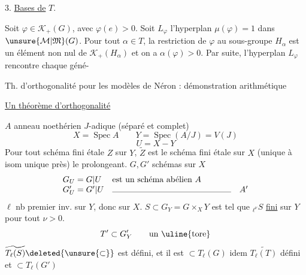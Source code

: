 3. \uline{Bases de} $T$.

Soit $\varphi\in\mathcal K_+(G)$, avec $\varphi(e)>0$. Soit $L_\varphi$ l'hyperplan $\mu(\varphi)=1$ dans $\unsure{\mathcal M|\mathfrak M}(G)$. Pour tout $\alpha\in T$, la restriction de $\varphi$ au sous-groupe $H_\alpha$ est un élément non nul de $\mathcal K_+(H_\alpha)$ et on a $\alpha(\varphi)>0$. Par suite, l'hyperplan $L_\varphi$ rencontre chaque géné-

Th. d'orthogonalité  pour les modèles de Néron : démonstration arithmétique

\uline{Un théorème d'orthogonalité}

$A$ anneau noethérien $J$-adique (séparé et complet)
\[
X=\operatorname{Spec}A\qquad
Y=\operatorname{Spec}(A/J)=V(J)
\]
\[
U=X-Y
\]
Pour tout schéma fini étale $Z$ sur $Y$, $\widetilde Z$ est le schéma fini étale sur $X$ (unique à isom unique près) le prolongeant.
$G,G'$ schémas    sur $X$ 
\[
\begin{array}{ll}
G_U=G|U&\text{est un schéma abélien }A\\
G'_U=G'|U&\text{\rule{5cm}{.3pt}}\quad A'
\end{array}
\]
$\ell$  nb premier inv. sur $Y$, donc sur $X$.
$S\subset G_Y=G\times_XY$ est  tel que ${}_{\ell^\nu}S$ \uline{fini} sur $Y$ pour tout $\nu>0$.
\[
T'\subset G'_Y\qquad\text{un \uline{tore}}
\]
$\widetilde{T_\ell(S)}\deleted{\unsure{\subset}}$ est défini, et il est $\subset T_\ell(G)$
idem $\widetilde{T_\ell(T)}$ défini et $\subset T_\ell(G')$
